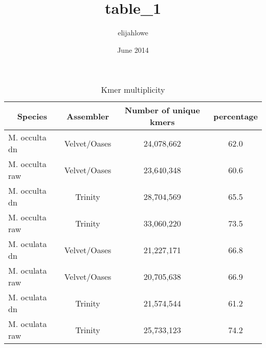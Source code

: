 \documentclass{article}
\title{table_1}
\author{elijahlowe }
\date{June 2014}
\begin{document}
\begin{table}[ht]
\renewcommand\thetable{Supplement 1}
\caption{Assembly Statistics}
\label{table:nonlin}
\end{table}

\newpage

\begin{table}[ht]
\renewcommand\thetable{Supplement 2}
\caption{Kmer multiplicity}
\centering
\begin{tabular}{l c c c}
\hline\hline
\multicolumn{1}{c}{Species} & Assembler & Number of unique kmers & percentage \\ [0.5ex] %
\hline
M. occulta dn&Velvet/Oases&24,078,662 & 62.0\\
M. occulta raw &Velvet/Oases&23,640,348 & 60.6 \\
M. occulta dn&Trinity&28,704,569 & 65.5\\
M. occulta raw&Trinity&33,060,220 & 73.5 \\
M. oculata dn&Velvet/Oases&21,227,171 & 66.8 \\
M. oculata raw&Velvet/Oases&20,705,638 & 66.9 \\
M. oculata dn&Trinity&21,574,544 & 61.2 \\
M. oculata raw&Trinity&25,733,123 & 74.2 \\ [1ex]
\hline
\end{tabular}
\label{table:nonlin}
\end{table}
\end{document}
